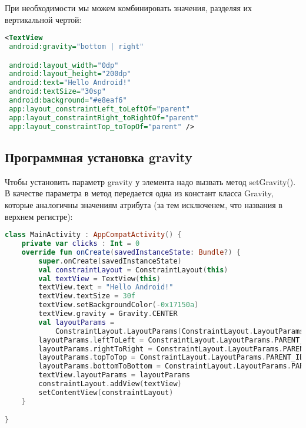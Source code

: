 При необходимости мы можем комбинировать значения, разделяя их
вертикальной чертой:
\begin{lstlisting}[language=xml, caption=\leftline{xml}, label=lst:Gravity2]
<TextView
 android:gravity="bottom | right"

 android:layout_width="0dp"
 android:layout_height="200dp"
 android:text="Hello Android!"
 android:textSize="30sp"
 android:background="#e8eaf6"
 app:layout_constraintLeft_toLeftOf="parent"
 app:layout_constraintRight_toRightOf="parent"
 app:layout_constraintTop_toTopOf="parent" />
\end{lstlisting}
\subsection{Программная установка gravity}
Чтобы установить параметр gravity у элемента надо вызвать метод
setGravity(). В качестве параметра в метод передается одна из констант
класса Gravity, которые аналогичны значениям атрибута (за тем
исключенем, что названия в верхнем регистре):
\begin{lstlisting}[language=Kotlin, caption=\leftline{Kotlin}, label=lst:gravity]
    class MainActivity : AppCompatActivity() {
    private var clicks : Int = 0
    override fun onCreate(savedInstanceState: Bundle?) {
        super.onCreate(savedInstanceState)
        val constraintLayout = ConstraintLayout(this)
        val textView = TextView(this)
        textView.text = "Hello Android!"
        textView.textSize = 30f
        textView.setBackgroundColor(-0x17150a)
        textView.gravity = Gravity.CENTER
        val layoutParams =
            ConstraintLayout.LayoutParams(ConstraintLayout.LayoutParams.MATCH_CONSTRAINT, 200)
        layoutParams.leftToLeft = ConstraintLayout.LayoutParams.PARENT_ID
        layoutParams.rightToRight = ConstraintLayout.LayoutParams.PARENT_ID
        layoutParams.topToTop = ConstraintLayout.LayoutParams.PARENT_ID
        layoutParams.bottomToBottom = ConstraintLayout.LayoutParams.PARENT_ID
        textView.layoutParams = layoutParams
        constraintLayout.addView(textView)
        setContentView(constraintLayout)
    }

}
\end{lstlisting}
